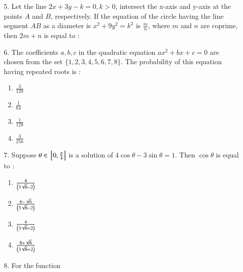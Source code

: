 \documentclass[journal,12pt,onecolumn]{IEEEtran}
\theoremstyle{remark}
\begin{document}
\begin{enumerate}
	\item[5.] Let the line $2x + 3y - k = 0, k > 0$, intersect the x-axis and y-axis at the points 
        $A$ and $B$, respectively. If the equation of the circle having the line segment $AB$ as
        a diameter is $x^2 + 9y^2 = k^2$ is $\frac{m}{n}$, where $m$ and $n$ are coprime, then
        $2m + n$ is equal to :
		\hfill{}
		\begin{enumerate}
		\end{enumerate}
	\item[6.]
        The coefficients $a, b, c$ in the quadratic equation $ax^2 + bx +c = 0$ are chosen from the 
        set $\{ 1, 2 , 3, 4, 5, 6, 7, 8\}$. The probability of this equation having repeated roots is :
		\hfill{\brak{2024-Apr}}
		\begin{multicols}{4}
		\begin{enumerate}
            \item $\frac{3}{128}$ \columnbreak
            \item $\frac{1}{64}$ \columnbreak
            \item $\frac{1}{128}$ \columnbreak
            \item $\frac{3}{256}$
		\end{enumerate}
	\end{multicols}
\item[7.] Suppose $\theta \in {}\left[0, \frac{\pi}{4}\right]$ is a solution of $4\cos \theta - 3 \sin \theta = 1$. 
    Then $\cos \theta$ is equal to :
		\hfill{}
		\begin{enumerate}
            \item $\frac{4}{\left(3\sqrt{6} - 2\right)}$ 
            \item $\frac{6 - \sqrt{6}}{\left(3\sqrt{6} - 2\right)}$ 
            \item $\frac{4}{\left(3\sqrt{6} + 2\right)}$ 
            \item $\frac{6 + \sqrt{6}}{\left(3\sqrt{6} + 2\right)}$ 
		\end{enumerate}
\item[8.]
    For the function
	\begin{align}

\end{align}
\end{enumerate}
\end{document}
